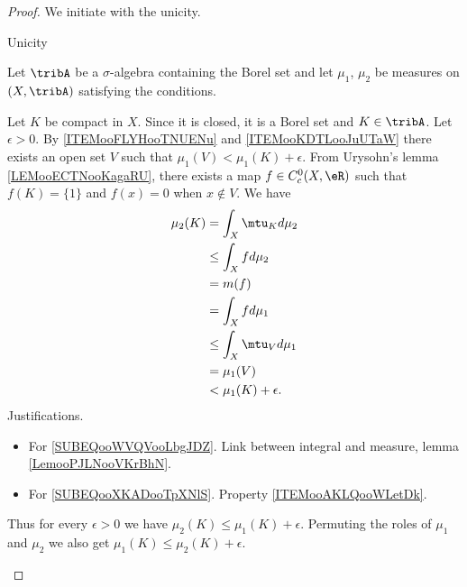 \begin{proof}
    We initiate with the unicity.
    \begin{center}
        Unicity
    \end{center}
    Let \( \tribA\) be a \( \sigma\)-algebra containing the Borel set and let \( \mu_1\), \( \mu_2\) be measures on \( (X,\tribA)\) satisfying the conditions.
    \begin{subproof}

    Let \( K\) be compact in \( X\). Since it is closed, it is a Borel set and \( K\in \tribA\). Let \( \epsilon>0\). By \ref{ITEMooFLYHooTNUENu} and \ref{ITEMooKDTLooJuUTaW} there exists an open set \( V\) such that \( \mu_1(V)<\mu_1(K)+\epsilon\). From Urysohn's lemma \ref{LEMooECTNooKagaRU}, there exists a map \( f\in C^0_c(X,\eR)\) such that \( f(K)=\{ 1 \}\) and \( f(x)=0\) when \( x\notin V\). We have
    \begin{subequations}
        \begin{align}
            \mu_2(K)&=\int_X\mtu_Kd\mu_2        \label{SUBEQooWVQVooLbgJDZ}\\
            &\leq \int_Xfd\mu_2\\
            &=m(f)                  \label{SUBEQooXKADooTpXNlS}\\
            &= \int_Xfd\mu_1\\
            &\leq \int_X\mtu_{V}d\mu_1\\
            &=\mu_1(V)\\
            &<\mu_1(K)+\epsilon.
        \end{align}
    \end{subequations}
    Justifications.
    \begin{itemize}
        \item For \eqref{SUBEQooWVQVooLbgJDZ}. Link between integral and measure, lemma \ref{LemooPJLNooVKrBhN}.
        \item For \eqref{SUBEQooXKADooTpXNlS}. Property \ref{ITEMooAKLQooWLetDk}.
    \end{itemize}
    Thus for every \( \epsilon>0\) we have \( \mu_2(K)\leq \mu_1(K)+\epsilon\). Permuting the roles of \( \mu_1\) and \( \mu_2\) we also get \( \mu_1(K)\leq \mu_2(K)+\epsilon\).


\end{subproof}
\end{proof}

